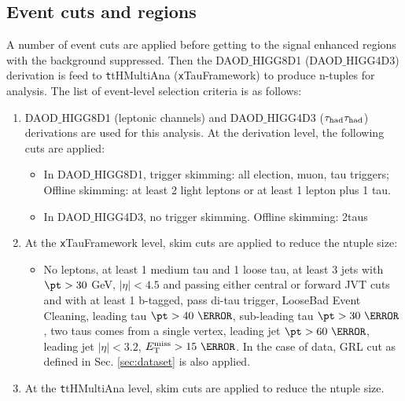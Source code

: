 \subsection{Event cuts and regions}
\label{sec:cuts}

A number of event cuts are applied before getting to the signal enhanced regions with the background suppressed. Then the DAOD$\_$HIGG8D1 (DAOD$\_$HIGG4D3) derivation is feed to {\texttt ttHMultiAna} ({\texttt xTauFramework}) to produce n-tuples for analysis. The list of event-level selection criteria is as follows:

\begin{enumerate}
\item DAOD$\_$HIGG8D1 (leptonic channels) and DAOD$\_$HIGG4D3 ($\tau_\text{had}{}\tau_\text{had}$) derivations are used for this analysis. At the derivation level, the following cuts are applied:
  \begin{itemize}


  \item In DAOD$\_$HIGG8D1, trigger skimming: all election, muon, tau triggers; Offline skimming: at least 2 light leptons or at least 1 lepton plus 1 tau.
  \item In DAOD$\_$HIGG4D3, no trigger skimming. Offline skimming: 2taus
  \end{itemize}

\item At the {\texttt xTauFramework} level, skim cuts are applied to reduce the ntuple size:
  \begin{itemize}
  \item No leptons, at least 1 medium tau and 1 loose tau, at least 3 jets with $\pt>30$ GeV, $|\eta|<4.5$ and passing either central or forward JVT cuts and with at least 1 b-tagged, pass di-tau trigger, LooseBad Event Cleaning, leading tau $\pt>40~\GeV$, sub-leading tau $\pt>30~\GeV$, two taus comes from a single vertex, leading jet $\pt>60~\GeV$, leading jet $|\eta|<3.2$, $\met>15~\GeV$. In the case of data, GRL cut as defined in Sec. \ref{sec:dataset} is also applied.
  \end{itemize}

\item At the {\texttt ttHMultiAna} level, skim cuts \cite{ATL-COM-PHYS-2018-410} are applied to reduce the ntuple size.


\end{enumerate}
